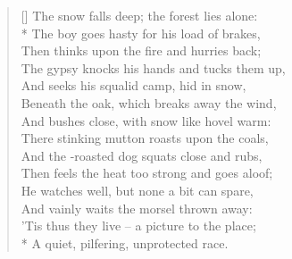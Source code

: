 \documentclass[MAIN]{subfiles}
\begin{document}
\settowidth{\versewidth}{When thou must home to shades of underground,}
\begin{verse}[\versewidth]
The snow falls deep; the forest lies alone:\\*
The boy goes hasty for his load of brakes,\\
Then thinks upon the fire and hurries back;\\
The gypsy knocks his hands and tucks them up,\\
And seeks his squalid camp,  hid in snow,\\
Beneath the oak, which breaks away the wind,\\
And bushes close, with snow like hovel warm:\\
There stinking mutton roasts upon the coals,\\
And the -roasted dog squats close and rubs,\\
Then feels the heat too strong and goes aloof;\\
He watches well, but none a bit can spare,\\
And vainly waits the morsel thrown away:\\
'Tis thus they live -- a picture to the place;\\*
A quiet, pilfering, unprotected race.
\end{verse}
\end{document}
